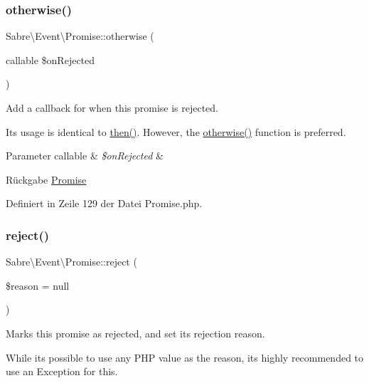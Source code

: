 \subsubsection{\texorpdfstring{otherwise()}{otherwise()}}
{\footnotesize\ttfamily Sabre\textbackslash{}\+Event\textbackslash{}\+Promise\+::otherwise (\begin{DoxyParamCaption}\item[{callable}]{\$on\+Rejected }\end{DoxyParamCaption})}

Add a callback for when this promise is rejected.

Its usage is identical to \mbox{\hyperlink{class_sabre_1_1_event_1_1_promise_aaacfe0e7ff639e2db43db8e9143b326e}{then()}}. However, the \mbox{\hyperlink{class_sabre_1_1_event_1_1_promise_aa45393483cc9bcc0feefcc53f0dba76c}{otherwise()}} function is preferred.


\begin{DoxyParams}[1]{Parameter}
callable & {\em \$on\+Rejected} & \\
\hline
\end{DoxyParams}
\begin{DoxyReturn}{Rückgabe}
\mbox{\hyperlink{class_sabre_1_1_event_1_1_promise}{Promise}} 
\end{DoxyReturn}


Definiert in Zeile 129 der Datei Promise.\+php.

\mbox{\label{class_sabre_1_1_event_1_1_promise_acea25bb367709121b776607c8d229e11}} 
\subsubsection{\texorpdfstring{reject()}{reject()}}
{\footnotesize\ttfamily Sabre\textbackslash{}\+Event\textbackslash{}\+Promise\+::reject (\begin{DoxyParamCaption}\item[{}]{\$reason = {\ttfamily null} }\end{DoxyParamCaption})}

Marks this promise as rejected, and set it\textquotesingle{}s rejection reason.

While it\textquotesingle{}s possible to use any P\+HP value as the reason, it\textquotesingle{}s highly recommended to use an Exception for this.



